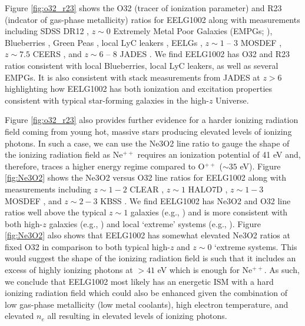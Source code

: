 \documentclass[twocolumn,tight,times,linenumbers]{aastex631}
\begin{document}
		Figure \ref{fig:o32_r23} shows the O32 (tracer of ionization parameter) and R23 (indcator of gas-phase metallicity) ratios for EELG1002 along with measurements including SDSS DR12 \citep{Thomas2013}, $z \sim 0$ Extremely Metal Poor Galaxies (EMPGs; \citealt{Nishigaki2023}), Blueberries \citep{Yang2017_BB}, Green Peas \citep{Yang2017_GP}, local LyC leakers \citep{Izotov2016,Izotov2018}, EELGs \citep{Amorin2015}, $z \sim 1$ -- 3 MOSDEF \citep{Kriek2015}, $z \sim 7.5$ CEERS \citep{Sanders2023,Tang2023}, and $z \sim 6$ -- 8 JADES \citep{Cameron2023}. We find EELG1002 has O32 and R23 ratios consistent with local Blueberries, local LyC leakers, as well as several EMPGs. It is also consistent with stack measurements from JADES at $z > 6$ highlighting how EELG1002 has both ionization and excitation properties consistent with typical star-forming galaxies in the high-$z$ Universe. 
		
		
		Figure \ref{fig:o32_r23} also provides further evidence for a harder ionizing radiation field coming from young hot, massive stars producing elevated levels of ionizing photons. In such a case, we can use the Ne3O2 line ratio to gauge the shape of the ionizing radiation field as Ne$^{++}$ requires an ionization potential of 41 eV and, therefore, traces a higher energy regime compared to O$^{++}$ ($\sim 35$ eV). Figure \ref{fig:Ne3O2} shows the Ne3O2 versus O32 line ratios for EELG1002 along with measurements including $z \sim 1 - 2$ CLEAR \citep{Papovich2023}, $z \sim 1$ HALO7D \citep{Pharo2023}, $z \sim 1 - 3$ MOSDEF \citep{Jeong2020}, and $z \sim 2 - 3$ KBSS \citep{Strom2017}. We find EELG1002 has Ne3O2 and O32 line ratios well above the typical $z \sim 1$ galaxies (e.g., \citealt{Pharo2023}) and is more consistent with both high-$z$ galaxies (e.g., \citealt{Cameron2023,Tang2023}) and local `extreme' systems (e.g., \citealt{Izotov2016,Izotov2018,Yang2017_BB}). Figure \ref{fig:Ne3O2} also shows that EELG1002 has somewhat elevated Ne3O2 ratios at fixed O32 in comparison to both typical high-$z$ and $z \sim 0$ `extreme systems. This would suggest the shape of the ionizing radiation field is such that it includes an excess of highly ionizing photons at $> 41$ eV which is enough for Ne$^{++}$. As such, we conclude that EELG1002 most likely has an energetic ISM with a hard ionizing radiation field which could also be enhanced given the combination of low gas-phase metallicity (low metal coolants), high electron temperature, and elevated $n_e$ all resulting in elevated levels of ionizing photons.
\end{document}
